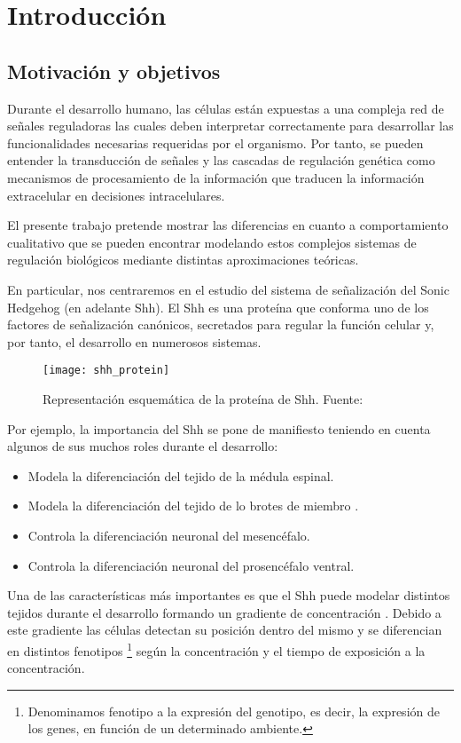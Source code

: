 \chapter{Introducción}

\section{ Motivación y objetivos}

Durante el desarrollo humano, las células están expuestas a una compleja red de señales reguladoras las cuales deben interpretar correctamente para desarrollar las funcionalidades necesarias requeridas por el organismo. Por tanto, se pueden entender la transducción de señales y las cascadas de regulación genética como mecanismos de procesamiento de la información que traducen la información extracelular en decisiones intracelulares.

El presente trabajo pretende mostrar las diferencias en cuanto a comportamiento cualitativo que se pueden encontrar modelando estos complejos sistemas de regulación biológicos mediante distintas aproximaciones teóricas. 

En particular, nos centraremos en el estudio del sistema de señalización del Sonic Hedgehog (en adelante Shh). 
El Shh es una proteína que conforma uno de los factores de señalización  canónicos, secretados
para regular la función celular y, por tanto, el desarrollo en numerosos sistemas.
\begin{figure}[h]
	\texttt{[image: shh\_protein]}
	\centering
	\caption{Representación esquemática de la proteína de Shh. Fuente: \cite{wiki:foto_shh}}
\end{figure}


Por ejemplo, la importancia del Shh se pone de manifiesto teniendo en cuenta algunos de sus muchos roles durante el desarrollo: 
\begin{itemize}
	\item Modela la diferenciación del tejido de la médula espinal.
	\item Modela la diferenciación del tejido de lo brotes de miembro .
	\item Controla la diferenciación neuronal del mesencéfalo. 
	\item Controla la diferenciación neuronal del prosencéfalo ventral.
\end{itemize}

Una de las características más importantes es que el Shh puede modelar distintos tejidos durante el desarrollo formando un gradiente de concentración \cite{saha}. Debido a este gradiente las células detectan su posición dentro del mismo y se diferencian en distintos fenotipos \footnote{Denominamos fenotipo a la expresión del genotipo, es decir, la expresión de los genes, en función de un determinado ambiente.} según la concentración y el tiempo de exposición a la concentración.

